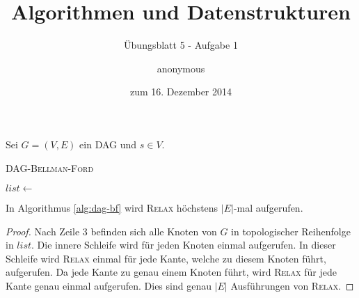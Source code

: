 \documentclass[a4paper]{scrartcl}
\title{Algorithmen und Datenstrukturen}
\subtitle{Übungsblatt 5 - Aufgabe 1}
\author{
    anonymous
}
\date{zum 16. Dezember 2014}
\begin{document}
\maketitle

Sei $G = (V, E)$ ein DAG und $s \in V$.

\begin{algorithm}
    \caption{\textsc{DAG-Bellman-Ford}}
    \label{alg:dag-bf}
    \begin{algorithmic}[1]
            \State {}
            \State $list \gets$ 
                    \State {}
                \EndFor
            \EndFor
        \EndProcedure
    \end{algorithmic}
\end{algorithm}

\begin{behaupt}
    In Algorithmus \ref{alg:dag-bf} wird \textsc{Relax} höchstens $|E|$-mal
    aufgerufen.
\end{behaupt}
\begin{proof}
    Nach Zeile 3 befinden sich alle Knoten von $G$ in topologischer Reihenfolge
    in $list$.
    Die innere Schleife wird für jeden Knoten einmal aufgerufen.
    In dieser Schleife wird \textsc{Relax} einmal für jede Kante, welche zu
    diesem Knoten führt, aufgerufen.
    Da jede Kante zu genau einem Knoten führt, wird \textsc{Relax} für jede
    Kante genau einmal aufgerufen.
    Dies sind genau $|E|$ Ausführungen von \textsc{Relax}.
\end{proof}
\end{document}
